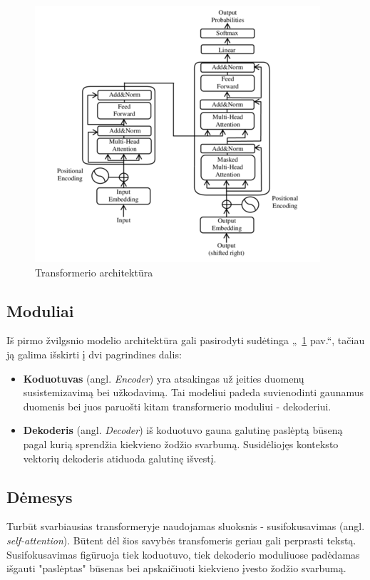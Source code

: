 \documentclass[conference]{IEEEtran}
\begin{document}
\begin{figure}
    \centering
    \includegraphics[scale=0.5]{transformer.png}
    \caption{Transformerio architektūra}
    \label{pav:1}
\end{figure}

\subsection{Moduliai}
Iš pirmo žvilgsnio modelio architektūra gali pasirodyti sudėtinga „~\ref{pav:1} pav.“, tačiau ją galima išskirti į dvi pagrindines dalis:
\begin{itemize}
  \item \textbf{Koduotuvas} (angl. \textit{Encoder}) yra atsakingas už įeities duomenų susistemizavimą bei užkodavimą. Tai modeliui padeda suvienodinti gaunamus duomenis bei juos paruošti kitam transformerio moduliui - dekoderiui.
  \item \textbf{Dekoderis} (angl. \textit{Decoder}) iš koduotuvo gauna galutinę paslėptą būseną pagal kurią sprendžia kiekvieno žodžio svarbumą. Susidėliojęs konteksto vektorių dekoderis atiduoda galutinę išvestį.
\end{itemize}
\subsection{Dėmesys}
Turbūt svarbiausias transformeryje naudojamas sluoksnis - susifokusavimas (angl. \textit{self-attention}). Būtent dėl šios savybės transfomeris geriau gali perprasti tekstą. Susifokusavimas figūruoja tiek koduotuvo, tiek dekoderio moduliuose padėdamas išgauti "paslėptas" būsenas bei apskaičiuoti kiekvieno įvesto žodžio svarbumą. 
\end{document}
